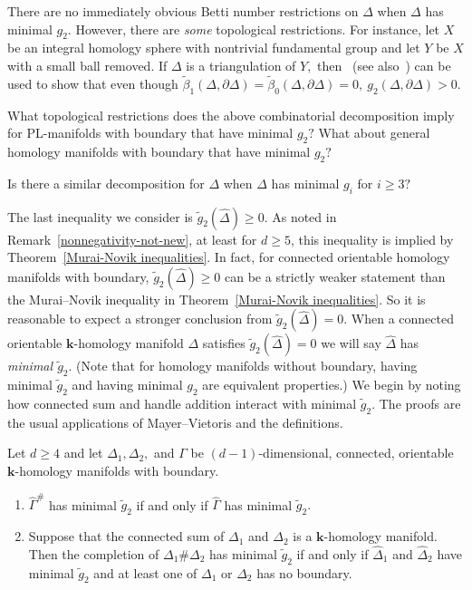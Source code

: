 \documentclass[ALCO,ThmDefs,Unicode,epreuves]{cedram}
\newcommand{\complet}[1]{\hat{#1}}
\newcommand{\field}{\mathbf{k}}
\begin{document}
There are no immediately obvious Betti number restrictions on $\Delta$ when $\Delta$ has minimal $g_2.$ However, there are \emph{some} topological restrictions. For instance, let $X$ be an integral homology sphere with nontrivial fundamental group and let $Y$ be $X$ with a small ball removed. If $\Delta$ is a triangulation of $Y,$ then~\cite[Theorem~7.3]{Murai-Novik-bdry} (see also~\cite{Murai-Novik-fundam-gp}) can be used to show that even though $\tilde{\beta}_1(\Delta, \partial \Delta) = \tilde{\beta}_0(\Delta, \partial \Delta)=0,~g_2(\Delta, \partial \Delta) > 0.$ 
 
 
 
 
 \begin{ques}
 What topological restrictions does the above combinatorial decomposition imply for PL-manifolds with boundary that have minimal $g_2?$ What about general homology manifolds with boundary that have minimal $g_2?$
 \end{ques}
 
 
 
 \begin{ques}
 Is there a similar decomposition for $\Delta$ when $\Delta$ has minimal $g_i$ for $i \ge 3?$
 \end{ques}
 
 The last inequality we consider is $\tilde{g}_2(\complet{\Delta}) \ge 0.$ As noted in Remark~\ref{nonnegativity-not-new}, at least for $d\geq 5$, this inequality is implied by Theorem~\ref{Murai-Novik inequalities}. In fact, for connected orientable homology manifolds with boundary, $\tilde{g}_2(\complet{\Delta}) \ge 0$ can be a strictly weaker statement than the Murai--Novik inequality in Theorem~\ref{Murai-Novik inequalities}. So it is reasonable to expect a stronger conclusion from $\tilde{g}_2(\complet{\Delta})=0.$ 
 When a connected orientable $\field$-homology manifold $\Delta$ satisfies $\tilde{g}_2(\complet{\Delta}) = 0$ we will say $\complet{\Delta}$ has \emph{minimal $\tilde{g}_2.$} (Note that for homology manifolds without boundary, having minimal $\tilde{g}_2$ and having minimal $g_2$ are equivalent properties.) We begin by noting how connected sum and handle addition interact with minimal $\tilde{g}_2.$ The proofs are the usual applications of Mayer--Vietoris and the definitions.
 \begin{prop} \label{connected sum and handle addition for g-tilde}
 Let $d\geq 4$ and let $\Delta_1, \Delta_2,$ and $\Gamma$ be $(d-1)$-dimensional, connected, orientable $\field$-homology manifolds with boundary. 
 \begin{enumerate}
 \item\label{prop7.14_1} 
 $\complet{\Gamma}^\#$ has minimal $\tilde{g}_2$ if and only if $\complet{\Gamma}$ has minimal $\tilde{g}_2.$
 \item\label{prop7.14_2}
 Suppose that the connected sum of $\Delta_1$ and $\Delta_2$ is a $\field$-homology manifold. Then the completion of $\Delta_1 \# \Delta_2$ has minimal $\tilde{g}_2$ if and only if $\complet{\Delta}_1$ and $\complet{\Delta}_2$ have minimal $\tilde{g}_2$ and at least one of $\Delta_1$ or $\Delta_2$ has no boundary. 
 \end{enumerate}
 \end{prop}
 
\end{document}
